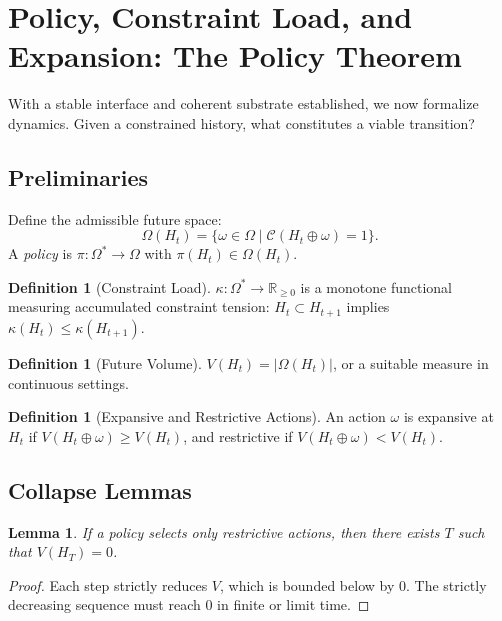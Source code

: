 \documentclass[12pt, a4paper]{article}
\theoremstyle{plain}
\newtheorem{lemma}[theorem]{Lemma}
\theoremstyle{definition}
\newtheorem{definition}[theorem]{Definition}
\theoremstyle{remark}
\begin{document}
\section{Policy, Constraint Load, and Expansion: The Policy Theorem}

With a stable interface and coherent substrate established, we now formalize dynamics. Given a constrained history, what constitutes a viable transition?

\subsection{Preliminaries}

Define the admissible future space:
\[
\Omega(H_t) = \{ \omega \in \Omega \mid \mathcal{C}(H_t \oplus \omega) = 1 \}.
\]
A \emph{policy} is $\pi : \Omega^* \to \Omega$ with $\pi(H_t) \in \Omega(H_t)$.

\begin{definition}[Constraint Load]
$\kappa : \Omega^* \to \mathbb{R}_{\geq 0}$ is a monotone functional measuring accumulated constraint tension: $H_t \subset H_{t+1}$ implies $\kappa(H_t) \leq \kappa(H_{t+1})$.
\end{definition}

\begin{definition}[Future Volume]
$V(H_t) = |\Omega(H_t)|$, or a suitable measure in continuous settings.
\end{definition}

\begin{definition}[Expansive and Restrictive Actions]
An action $\omega$ is expansive at $H_t$ if $V(H_t \oplus \omega) \geq V(H_t)$, and restrictive if $V(H_t \oplus \omega) < V(H_t)$.
\end{definition}

\subsection{Collapse Lemmas}

\begin{lemma}
If a policy selects only restrictive actions, then there exists $T$ such that $V(H_T) = 0$.
\end{lemma}

\begin{proof}
Each step strictly reduces $V$, which is bounded below by $0$. The strictly decreasing sequence must reach $0$ in finite or limit time.
\end{proof}
\end{document}
